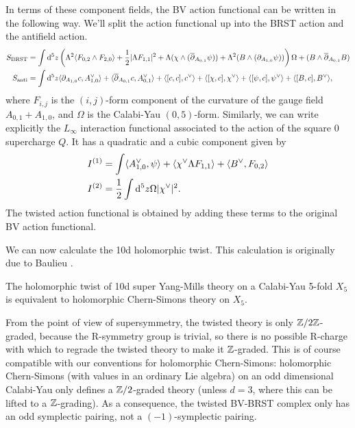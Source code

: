 \documentclass[10pt, oneside]{article}
\begin{document}
In terms of these component fields, the BV action functional can be written in the following way.  We'll split the action functional up into the BRST action and the antifield action.
\begin{align*}
S_{\mathrm{BRST}} &= \int {\rm d}^5z \left(\Lambda^2 \langle F_{0,2} \wedge F_{2,0}\rangle + \frac 12 |\Lambda F_{1,1}|^2 + \Lambda( \chi \wedge (\overline{\partial}_{A_{0,1}} \psi))  + \Lambda^2(B \wedge (\partial_{A_{1,0}} \psi))\right) \Omega + (B \wedge \overline{\partial}_{A_{0,1}} B) \\
S_{\mathrm{anti}} &= \int {\rm d}^5z \langle \partial_{A_{1,0}}c, A_{1,0}^\vee \rangle +  \langle \overline{\partial}_{A_{0,1}}c, A_{0,1}^\vee \rangle + \langle [c,c], c^\vee \rangle + \langle [\chi,c], \chi^\vee \rangle + \langle [\psi,c], \psi^\vee \rangle + \langle [B,c], B^\vee \rangle,
\end{align*}
where $F_{i,j}$ is the $(i,j)$-form component of the curvature of the gauge field $A_{0, 1} + A_{1, 0}$, and $\Omega$ is the Calabi-Yau $(0,5)$-form.  Similarly, we can write explicitly the $L_\infty$ interaction functional associated to the action of the square 0 supercharge $Q$.  It has a quadratic and a cubic component given by
\begin{align*}
I^{(1)} &= \int \langle A_{1,0}^\vee, \psi \rangle + \langle \chi^\vee \Lambda F_{1,1} \rangle + \langle B^\vee, F_{0,2} \rangle \\
I^{(2)} &= \frac 12 \int {\rm d}^5z \Omega |\chi^\vee|^2.
\end{align*}
The twisted action functional is obtained by adding these terms to the original BV action functional.

We can now calculate the 10d holomorphic twist.  This calculation is originally due to Baulieu \cite{Baulieu}.

\begin{theorem}\label{10d_twist_thm}
The holomorphic twist of 10d super Yang-Mills theory on a Calabi-Yau 5-fold $X_5$ is equivalent to holomorphic Chern-Simons theory on $X_5$.
\end{theorem}

\begin{remark}
From the point of view of supersymmetry, the twisted theory is only $\mathbb Z/2\mathbb Z$-graded, because the R-symmetry group is trivial, so there is no possible R-charge with which to regrade the twisted theory to make it $\mathbb Z$-graded.  
This is of course compatible with our conventions for holomorphic Chern-Simons: holomorphic Chern-Simons (with values in an ordinary Lie algebra) on an odd dimensional Calabi-Yau only defines a $\mathbb Z/2$-graded theory (unless $d=3$, where this can be lifted to a $\mathbb Z$-grading). 
As a consequence, the twisted BV-BRST complex only has an odd symplectic pairing, not a $(-1)$-symplectic pairing.
\end{remark}
\end{document}
